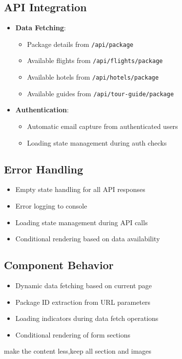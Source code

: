 \subsection{API Integration}
\begin{itemize}
    \item \textbf{Data Fetching}:
    \begin{itemize}
        \item Package details from \texttt{/api/package}
        \item Available flights from \texttt{/api/flights/package}
        \item Available hotels from \texttt{/api/hotels/package}
        \item Available guides from \texttt{/api/tour-guide/package}
    \end{itemize}
    
    \item \textbf{Authentication}:
    \begin{itemize}
        \item Automatic email capture from authenticated users
        \item Loading state management during auth checks
    \end{itemize}
\end{itemize}

\subsection{Error Handling}
\begin{itemize}
    \item Empty state handling for all API responses
    \item Error logging to console
    \item Loading state management during API calls
    \item Conditional rendering based on data availability
\end{itemize}

\subsection{Component Behavior}
\begin{itemize}
    \item Dynamic data fetching based on current page
    \item Package ID extraction from URL parameters
    \item Loading indicators during data fetch operations
    \item Conditional rendering of form sections
\end{itemize}

make the content less,keep all section and images